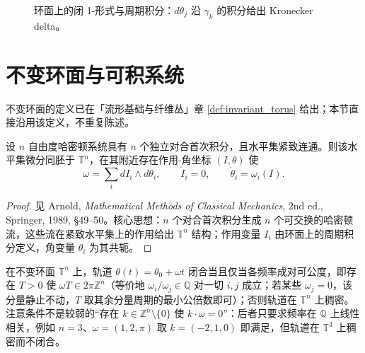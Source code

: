 \begin{figure}[htbp]
\centering
{}
\caption{环面上的闭 1-形式与周期积分：$d\theta_j$ 沿 $\gamma_k$ 的积分给出 Kronecker delta。}
\label{fig:period_integral}
\end{figure}

\section{不变环面与可积系统}\label{sec:invariant_torus_periodic}

\begin{remark}\label{rem:invariant_torus_source}
不变环面的定义已在「流形基础与纤维丛」章 \cref{def:invariant_torus} 给出；本节直接沿用该定义，不重复陈述。
\end{remark}

\begin{theorem}\label{thm:liouville_arnold_periodic}
设 $n$ 自由度哈密顿系统具有 $n$ 个独立对合首次积分，且水平集紧致连通。则该水平集微分同胚于 $\mathbb{T}^n$，在其附近存在作用-角坐标 $(I,\theta)$ 使
\[
\omega=\sum_i dI_i\wedge d\theta_i,\qquad \dot I_i=0,\qquad \dot\theta_i=\omega_i(I).
\]
\end{theorem}

\begin{proof}
见 Arnold, \textit{Mathematical Methods of Classical Mechanics}, 2nd ed., Springer, 1989, \S{}49--50。核心思想：$n$ 个对合首次积分生成 $n$ 个可交换的哈密顿流，这些流在紧致水平集上的作用给出 $\mathbb{T}^n$ 结构；作用变量 $I_i$ 由环面上的周期积分定义，角变量 $\theta_i$ 为其共轭。
\end{proof}

\begin{corollary}[周期轨道与准周期轨道的判据]\label{cor:periodic_vs_quasiperiodic}
在不变环面 $\mathbb{T}^n$ 上，轨道 $\theta(t)=\theta_0+\omega t$ 闭合当且仅当各频率成对可公度，即存在 $T>0$ 使 $\omega T\in2\pi\mathbb{Z}^n$（等价地 $\omega_i/\omega_j\in\mathbb{Q}$ 对一切 $i,j$ 成立；若某些 $\omega_j=0$，该分量静止不动，$T$ 取其余分量周期的最小公倍数即可）；否则轨道在 $\mathbb{T}^n$ 上稠密。注意条件不是较弱的“存在 $k\in\mathbb{Z}^n\setminus\{0\}$ 使 $k\cdot\omega=0$”：后者只要求频率在 $\mathbb{Q}$ 上线性相关，例如 $n=3$、$\omega=(1,2,\pi)$ 取 $k=(-2,1,0)$ 即满足，但轨道在 $\mathbb{T}^3$ 上稠密而不闭合。
\end{corollary}

